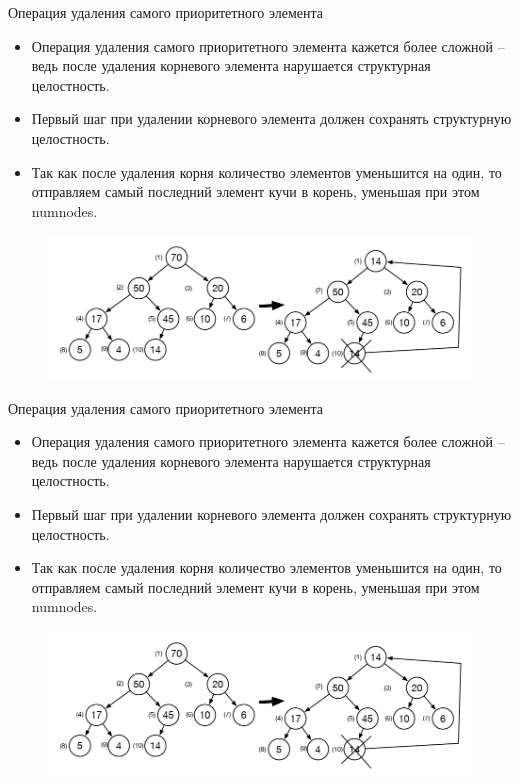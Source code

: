 \documentclass{beamer}
\begin{document}
\begin{frame}{Операция удаления самого приоритетного элемента}
	\begin{itemize}
		\item Операция удаления самого приоритетного элемента кажется более сложной -- ведь после удаления корневого элемента нарушается структурная целостность. 
		\item Первый шаг при удалении корневого элемента должен сохранять структурную целостность. 
		\item Так как после удаления корня количество элементов уменьшится на один, то отправляем самый последний элемент кучи в корень, уменьшая при этом numnodes.	
	\end{itemize}
	\begin{figure}[h]
		\centering
		\includegraphics[scale=0.5]{images/lec06-pic15.png}
	\end{figure}	
\end{frame}

\begin{frame}{Операция удаления самого приоритетного элемента}
	\begin{itemize}
		\item Операция удаления самого приоритетного элемента кажется более сложной -- ведь после удаления корневого элемента нарушается структурная целостность. 
		\item Первый шаг при удалении корневого элемента должен сохранять структурную целостность. 
		\item Так как после удаления корня количество элементов уменьшится на один, то отправляем самый последний элемент кучи в корень, уменьшая при этом numnodes.	
	\end{itemize}
	\begin{figure}[h]
		\centering
		\includegraphics[scale=0.5]{images/lec06-pic15.png}
	\end{figure}	
\end{frame}
\end{document}
